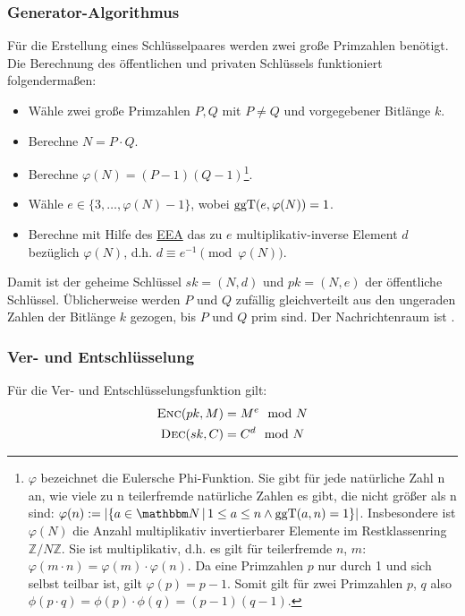 \subsubsection{Generator-Algorithmus}
Für die Erstellung eines Schlüsselpaares werden zwei große Primzahlen benötigt. Die Berechnung des öffentlichen und privaten Schlüssels funktioniert folgendermaßen:
\begin{itemize}
 	\item Wähle zwei große Primzahlen $P, Q$ mit $P \neq Q$ und vorgegebener Bitlänge $k$.
 	\item Berechne $N = P \cdot Q$.
 	\item Berechne $\varphi(N) = (P - 1)(Q - 1)$\footnote{$\varphi$
            bezeichnet die Eulersche Phi-Funktion. Sie gibt für jede
            natürliche Zahl n an, wie viele zu n teilerfremde natürliche
            Zahlen es gibt, die nicht größer als n sind: 
            $\varphi(n) := \vert \{a\in\N \, |\, 1 \le a \le n
            \land \operatorname{ggT}(a,n) = 1 \} \vert$. Insbesondere
            ist $\varphi(N)$ die Anzahl multiplikativ invertierbarer
            Elemente im Restklassenring $\mathbb{Z}/N\mathbb{Z}$.
            Sie ist multiplikativ, d.h. es gilt für teilerfremde $n$, $m$:
            $\varphi(m\cdot n) = \varphi(m) \cdot \varphi(n)$. Da eine
            Primzahlen $p$ nur durch 1 und sich selbst teilbar ist, 
            gilt $\varphi(p) = p-1$. Somit gilt für zwei Primzahlen $p$,
            $q$ also $\phi(p \cdot q) = \phi(p) \cdot \phi(q) = (p-1)(q-1)$.}.
 	\item Wähle $e \in \{3, \dotsc, \varphi(N) - 1\}$, wobei $\operatorname{ggT}(e, \varphi(N)) = 1$.
 	\item Berechne mit Hilfe des \hyperref[ssec:eea]{EEA} das zu $e$ multiplikativ-inverse Element $d$ bezüglich $\varphi(N)$, d.h. $d \equiv e^{-1} \pmod{\varphi(N)}$.
\end{itemize}

Damit ist der geheime Schlüssel $sk = (N, d)$ und $pk = (N, e)$ der
öffentliche Schlüssel. Üblicherweise werden $P$ und $Q$ zufällig
gleichverteilt aus den ungeraden Zahlen der Bitlänge $k$ gezogen, bis
$P$ und $Q$ prim sind. Der Nachrichtenraum ist . 
\subsubsection{Ver- und Entschlüsselung}
Für die Ver- und
Entschlüsselungsfunktion gilt: 
\begin{align*}
	\textsc{Enc}(pk, M) & = M^e \mod N \\
	\textsc{Dec}(sk, C) & = C^d \mod N  
\end{align*}

